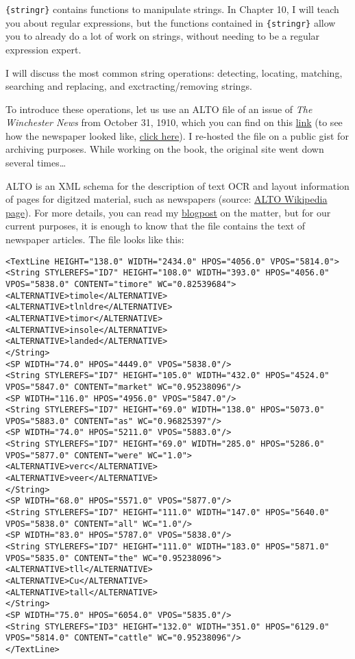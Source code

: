 \documentclass[
]{article}
\begin{document}
\texttt{\{stringr\}} contains functions to manipulate strings. In Chapter 10, I will teach you about regular
expressions, but the functions contained in \texttt{\{stringr\}} allow you to already do a lot of work on
strings, without needing to be a regular expression expert.

I will discuss the most common string operations: detecting, locating, matching, searching and
replacing, and exctracting/removing strings.

To introduce these operations, let us use an ALTO file of an issue of \emph{The Winchester News} from
October 31, 1910, which you can find on this
\href{https://gist.githubusercontent.com/b-rodrigues/5139560e7d0f2ecebe5da1df3629e015/raw/e3031d894ffb97217ddbad1ade1b307c9937d2c8/gistfile1.txt}{link} (to see
how the newspaper looked like,
\href{https://chroniclingamerica.loc.gov/lccn/sn86069133/1910-10-31/ed-1/seq-1/}{click here}). I re-hosted
the file on a public gist for archiving purposes. While working on the book, the original site went
down several times\ldots{}

ALTO is an XML schema for the description of text OCR and layout information of pages for digitzed
material, such as newspapers (source: \href{https://en.wikipedia.org/wiki/ALTO_(XML)}{ALTO Wikipedia page}).
For more details, you can read my
\href{https://www.brodrigues.co/blog/2019-01-13-newspapers_mets_alto/}{blogpost}
on the matter, but for our current purposes, it is enough to know that the file contains the text
of newspaper articles. The file looks like this:

\begin{verbatim}
<TextLine HEIGHT="138.0" WIDTH="2434.0" HPOS="4056.0" VPOS="5814.0">
<String STYLEREFS="ID7" HEIGHT="108.0" WIDTH="393.0" HPOS="4056.0" VPOS="5838.0" CONTENT="timore" WC="0.82539684">
<ALTERNATIVE>timole</ALTERNATIVE>
<ALTERNATIVE>tlnldre</ALTERNATIVE>
<ALTERNATIVE>timor</ALTERNATIVE>
<ALTERNATIVE>insole</ALTERNATIVE>
<ALTERNATIVE>landed</ALTERNATIVE>
</String>
<SP WIDTH="74.0" HPOS="4449.0" VPOS="5838.0"/>
<String STYLEREFS="ID7" HEIGHT="105.0" WIDTH="432.0" HPOS="4524.0" VPOS="5847.0" CONTENT="market" WC="0.95238096"/>
<SP WIDTH="116.0" HPOS="4956.0" VPOS="5847.0"/>
<String STYLEREFS="ID7" HEIGHT="69.0" WIDTH="138.0" HPOS="5073.0" VPOS="5883.0" CONTENT="as" WC="0.96825397"/>
<SP WIDTH="74.0" HPOS="5211.0" VPOS="5883.0"/>
<String STYLEREFS="ID7" HEIGHT="69.0" WIDTH="285.0" HPOS="5286.0" VPOS="5877.0" CONTENT="were" WC="1.0">
<ALTERNATIVE>verc</ALTERNATIVE>
<ALTERNATIVE>veer</ALTERNATIVE>
</String>
<SP WIDTH="68.0" HPOS="5571.0" VPOS="5877.0"/>
<String STYLEREFS="ID7" HEIGHT="111.0" WIDTH="147.0" HPOS="5640.0" VPOS="5838.0" CONTENT="all" WC="1.0"/>
<SP WIDTH="83.0" HPOS="5787.0" VPOS="5838.0"/>
<String STYLEREFS="ID7" HEIGHT="111.0" WIDTH="183.0" HPOS="5871.0" VPOS="5835.0" CONTENT="the" WC="0.95238096">
<ALTERNATIVE>tll</ALTERNATIVE>
<ALTERNATIVE>Cu</ALTERNATIVE>
<ALTERNATIVE>tall</ALTERNATIVE>
</String>
<SP WIDTH="75.0" HPOS="6054.0" VPOS="5835.0"/>
<String STYLEREFS="ID3" HEIGHT="132.0" WIDTH="351.0" HPOS="6129.0" VPOS="5814.0" CONTENT="cattle" WC="0.95238096"/>
</TextLine>
\end{verbatim}
\end{document}
